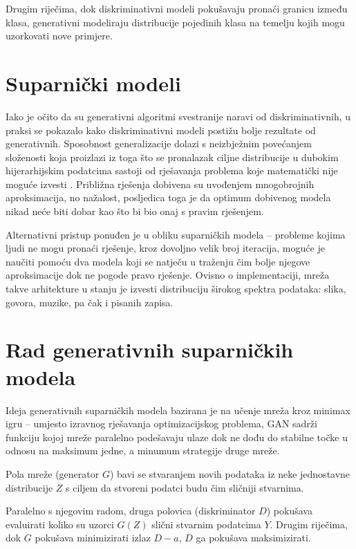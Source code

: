 \documentclass[lmodern, utf8, seminar]{fer}
\begin{document}
Drugim riječima, dok diskriminativni modeli pokušavaju pronaći granicu između klasa, generativni modeliraju distribucije pojedinih klasa na temelju kojih mogu uzorkovati nove primjere.
\newline

\newpage
\section{Suparnički modeli}
Iako je očito da su generativni algoritmi svestranije naravi od diskriminativnih, u praksi se pokazalo kako diskriminativni modeli postižu bolje rezultate od generativnih. Sposobnost generalizacije dolazi s neizbježnim povećanjem složenosti koja proizlazi iz toga što se pronalazak ciljne distribucije u dubokim hijerarhijskim podatcima sastoji od rješavanja problema koje matematički nije moguće izvesti \cite{goodfellow2014generative}. Približna rješenja dobivena su uvođenjem mnogobrojnih aproksimacija, no nažalost, posljedica toga je da optimum dobivenog modela nikad neće biti dobar kao što bi bio onaj s pravim rješenjem.
\newline

Alternativni pristup ponuđen je u obliku suparničkih modela -- probleme kojima ljudi ne mogu pronaći rješenje, kroz dovoljno velik broj iteracija, moguće je naučiti pomoću dva modela koji se natječu u traženju čim bolje njegove aproksimacije dok ne pogode pravo rješenje. Ovisno o implementaciji, mreža takve arhitekture u stanju je izvesti distribuciju širokog spektra podataka: slika, govora, muzike, pa čak i pisanih zapisa.
\newline



\section{Rad generativnih suparničkih modela}
Ideja generativnih suparničkih modela bazirana je na učenje mreža kroz minimax igru -- umjesto izravnog rješavanja optimizacijskog problema, GAN sadrži funkciju kojoj mreže paralelno podešavaju ulaze dok ne dođu do stabilne točke u odnosu na maksimum jedne, a minumum strategije druge mreže. 
\newline

Pola mreže (generator $G$) bavi se stvaranjem novih podataka iz neke jednostavne distribucije $Z$ s ciljem da stvoreni podatci budu čim sličniji stvarnima. 

Paralelno s njegovim radom, druga polovica (diskriminator $D$) pokušava evaluirati koliko su uzorci $G(Z)$ slični stvarnim podatcima $Y$. Drugim riječima, dok $G$ pokušava minimizirati izlaz $D-a$, $D$ ga pokušava maksimizirati.
\newline
\newpage
\end{document}
